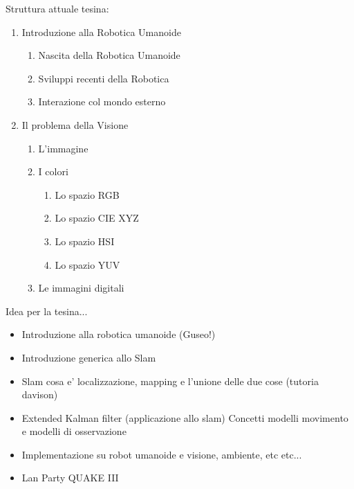 \documentclass[pdftex,a4paper,12pt,twoside,openright]{report}
\begin{document}
Struttura attuale tesina:
\begin{enumerate}
\item Introduzione alla Robotica Umanoide
  \begin{enumerate}
  \item Nascita della Robotica Umanoide
  \item Sviluppi recenti della Robotica
  \item Interazione col mondo esterno
  \end{enumerate}
\item Il problema della Visione
  \begin{enumerate}
  \item L'immagine
  \item I colori
    \begin{enumerate}
    \item Lo spazio RGB
    \item Lo spazio CIE XYZ
    \item Lo spazio HSI
    \item Lo spazio YUV
    \end{enumerate}
  \item Le immagini digitali
  \end{enumerate}
\end{enumerate}


Idea per la tesina...\\

\begin{itemize}
\item Introduzione alla robotica umanoide (Guseo!)
\item Introduzione generica allo Slam
\item Slam cosa e' localizzazione, mapping e l'unione delle due cose (tutoria davison)
\item Extended Kalman filter (applicazione allo slam) Concetti modelli movimento e modelli di osservazione
\item Implementazione su robot umanoide e visione, ambiente, etc etc...
\item Lan Party QUAKE III

\end{itemize}
\end{document}
